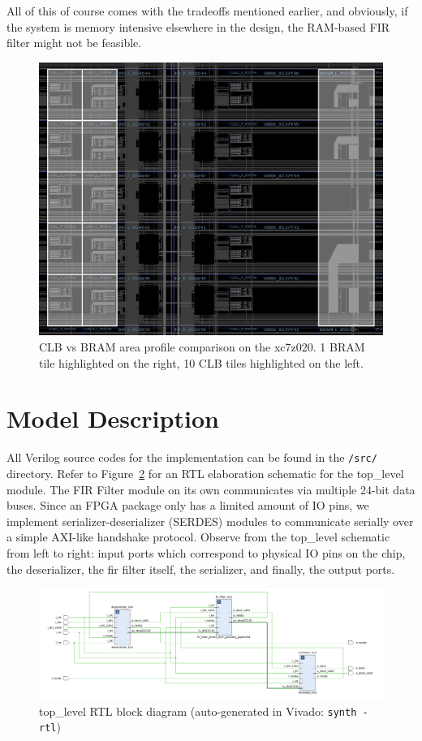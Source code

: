 \documentclass{article}
\begin{document}
    All of this of course comes with the tradeoffs mentioned earlier, and obviously, if the system is memory intensive elsewhere in the design, the RAM-based FIR filter might not be feasible.
    \begin{figure}
        \centering
        \includegraphics[width=1.25\textwidth]{figures/CLB_BRAM.png}
        \caption{CLB vs BRAM area profile comparison on the xc7z020. 1 BRAM tile highlighted on the right, 10 CLB tiles highlighted on the left.}
        \label{fig:CLB_BRAM}
    \end{figure}

\section{Model Description}
    All Verilog source codes for the implementation can be found in the \texttt{/src/} directory.
    Refer to Figure~\ref{fig:rtl_top_level} for an RTL elaboration schematic for the top\_level module.
    The FIR Filter module on its own communicates via multiple 24-bit data buses.
    Since an FPGA package only has a limited amount of IO pins, we implement serializer-deserializer (SERDES) modules to communicate serially over a simple AXI-like handshake protocol.
    Observe from the top\_level schematic from left to right: input ports which correspond to physical IO pins on the chip, the deserializer, the fir filter itself, the serializer, and finally, the output ports.
    \begin{figure}
        \centering
        \includegraphics[width=1.4\textwidth]{figures/rtl_top_level.png}
        \caption{top\_level RTL block diagram (auto-generated in Vivado: \texttt{synth -rtl})}
        \label{fig:rtl_top_level}
    \end{figure}
\end{document}
